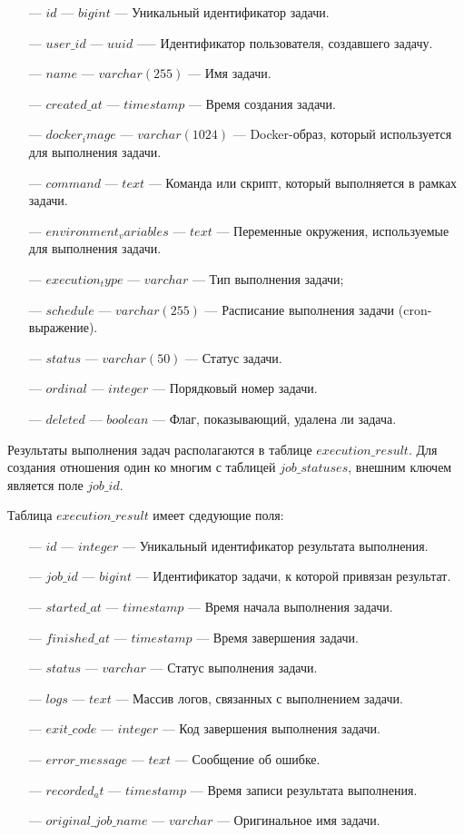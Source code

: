 \begin{itemize}
  \item[---]$id$ --- $bigint$ — Уникальный идентификатор задачи.
  \item[---]$user\_id$ --- $uuid$ —-- Идентификатор пользователя, создавшего задачу.
  \item[---]$name$ --- $varchar(255)$ — Имя задачи.
  \item[---]$created\_at$ --- $timestamp$ — Время создания задачи.
  \item[---]$docker_image$ --- $varchar(1024)$ — Docker-образ, который используется для выполнения задачи.
  \item[---]$command$ --- $text$ — Команда или скрипт, который выполняется в рамках задачи.
  \item[---]$environment_variables$ --- $text$ — Переменные окружения, используемые для выполнения задачи.
  \item[---]$execution_type$ --- $varchar$ — Тип выполнения задачи;
  \item[---]$schedule$ --- $varchar(255)$ — Расписание выполнения задачи (cron-выражение).
  \item[---]$status$ --- $varchar(50)$ — Статус задачи.
  \item[---]$ordinal$ --- $integer$ — Порядковый номер задачи.
  \item[---]$deleted$ --- $boolean$ — Флаг, показывающий, удалена ли задача.
\end{itemize}

Результаты выполнения задач располагаются в таблице $execution\_result$. Для создания отношения один ко многим с таблицей $job\_statuses$, внешним ключем является поле $job\_id$.

Таблица $execution\_result$ имеет сдедующие поля:

\begin{itemize}
  \item[---]$id$ --- $integer$ — Уникальный идентификатор результата выполнения.
  \item[---]$job\_id$ --- $bigint$ — Идентификатор задачи, к которой привязан результат. 
  \item[---]$started\_at$ --- $timestamp$ — Время начала выполнения задачи.
  \item[---]$finished\_at$ --- $timestamp$ — Время завершения задачи.
  \item[---]$status$ --- $varchar$ — Статус выполнения задачи.
  \item[---]$logs$ --- $text$ — Массив логов, связанных с выполнением задачи.
  \item[---]$exit\_code$ --- $integer$ — Код завершения выполнения задачи.
  \item[---]$error\_message$ --- $text$ — Сообщение об ошибке.
  \item[---]$recorded_at$ --- $timestamp$ — Время записи результата выполнения.
  \item[---]$original\_job\_name$ --- $varchar$ — Оригинальное имя задачи.
\end{itemize}

